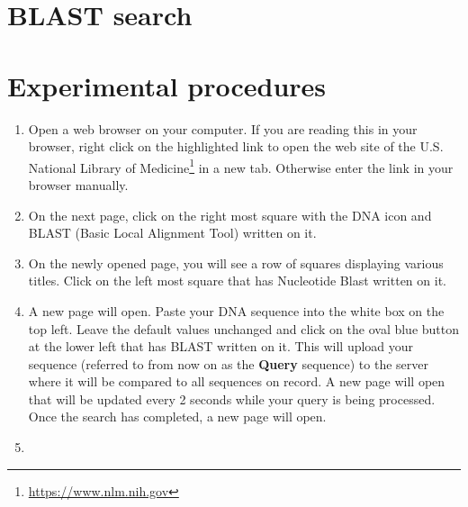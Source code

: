 \documentclass[]{book}
\let\rmarkdownfootnote\footnote%
\def\footnote{\protect\rmarkdownfootnote}
\renewcommand{\href}[2]{#2\footnote{\url{#1}}}
\theoremstyle{definition}
\theoremstyle{definition}
\theoremstyle{definition}
\theoremstyle{remark}
\begin{document}
\section{BLAST search}\label{blast-search}

\section{Experimental procedures}\label{experimental-procedures-19}

\begin{enumerate}
\def\labelenumi{\arabic{enumi}.}
\item
  Open a web browser on your computer. If you are reading this in your
  browser, right click on the highlighted link to open the web site of
  the \href{https://www.nlm.nih.gov}{U.S. National Library of Medicine}
  in a new tab. Otherwise enter the link in your browser manually.
\item
  On the next page, click on the right most square with the DNA icon and
  BLAST (Basic Local Alignment Tool) written on it.
\item
  On the newly opened page, you will see a row of squares displaying
  various titles. Click on the left most square that has Nucleotide
  Blast written on it.
\item
  A new page will open. Paste your DNA sequence into the white box on
  the top left. Leave the default values unchanged and click on the oval
  blue button at the lower left that has BLAST written on it. This will
  upload your sequence (referred to from now on as the \textbf{Query}
  sequence) to the server where it will be compared to all sequences on
  record. A new page will open that will be updated every 2 seconds
  while your query is being processed. Once the search has completed, a
  new page will open.
\item
\end{enumerate}
\end{document}
